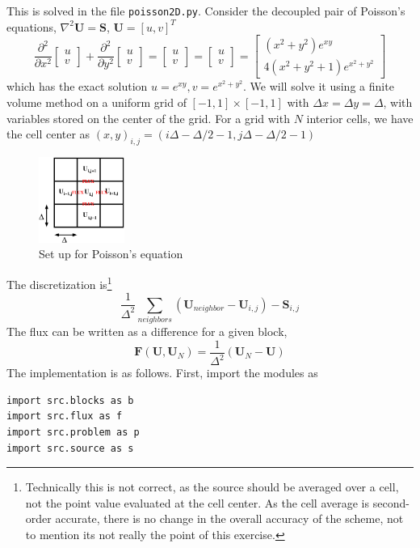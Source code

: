 \documentclass[11pt]{article}
\begin{document}
This is solved in the file \lstinline{poisson2D.py}. Consider the decoupled pair of Poisson's equations, $\nabla^2 \mathbf{U} = \mathbf{S}$, $\mathbf{U} = [u,v]^T$
\begin{equation}
\frac{\partial^2}{\partial x^2}\left[ \begin{array}{c} u \\ v \end{array}\right] + \frac{\partial^2}{\partial y^2}\left[ \begin{array}{c} u \\ v \end{array}\right] = \left[ \begin{array}{c} u \\ v \end{array}\right] = \left[ \begin{array}{c} u \\ v \end{array}\right] = \left[ \begin{array}{c} (x^2+y^2)e^{xy} \\ 4(x^2+y^2+1)e^{x^2+y^2}  \end{array}\right]
\end{equation}
which has the exact solution $u = e^{xy}, v = e^{x^2+y^2}$. We will solve it using a finite volume method on a uniform grid of $[-1,1]\times[-1,1]$ with $\Delta x = \Delta y = \Delta$, with variables stored on the center of the grid. For a grid with $N$ interior cells, we have the cell center as $(x,y)_{i,j} = (i\Delta-\Delta/2-1, j\Delta-\Delta/2-1)$
\begin{figure}
\centering
\includegraphics[width=0.25\textwidth]{poisson.pdf}
\caption{Set up for Poisson's equation}
\end{figure}
The discretization is\footnote{Technically this is not correct, as the source should be averaged over a cell, not the point value evaluated at the cell center. As the cell average is second-order accurate, there is no change in the overall accuracy of the scheme, not to mention its not really the point of this exercise.}
\begin{equation}
\frac{1}{\Delta^2}\sum_{neighbors} (\mathbf{U}_{neighbor}-\mathbf{U}_{i,j}) - \mathbf{S}_{i,j}
\end{equation}
The flux can be written as a difference for a given block,
\begin{equation}
\mathbf{F}(\mathbf{U},\mathbf{U}_N) = \frac{1}{\Delta^2}(\mathbf{U}_N - \mathbf{U})
\end{equation}
The implementation is as follows. First, import the modules as
\begin{lstlisting}
import src.blocks as b
import src.flux as f
import src.problem as p
import src.source as s
\end{lstlisting}
\end{document}
